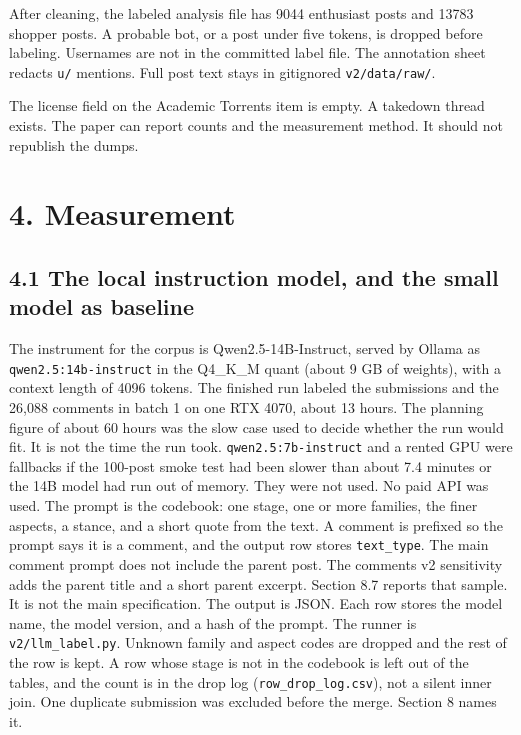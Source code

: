 \documentclass[11pt]{article}
\begin{document}
After cleaning, the labeled analysis file has 9044 enthusiast posts and 13783 shopper posts. A probable bot, or a post under five tokens, is dropped before labeling. Usernames are not in the committed label file. The annotation sheet redacts \texttt{u/} mentions. Full post text stays in gitignored \texttt{v2/data/raw/}.


The license field on the Academic Torrents item is empty. A takedown thread exists. The paper can report counts and the measurement method. It should not republish the dumps.


\section{4. Measurement}

\subsection{4.1 The local instruction model, and the small model as baseline}

The instrument for the corpus is Qwen2.5-14B-Instruct, served by Ollama as \texttt{qwen2.5:14b-instruct} in the Q4\_K\_M quant (about 9 GB of weights), with a context length of 4096 tokens. The finished run labeled the submissions and the 26,088 comments in batch 1 on one RTX 4070, about 13 hours. The planning figure of about 60 hours was the slow case used to decide whether the run would fit. It is not the time the run took. \texttt{qwen2.5:7b-instruct} and a rented GPU were fallbacks if the 100-post smoke test had been slower than about 7.4 minutes or the 14B model had run out of memory. They were not used. No paid API was used. The prompt is the codebook: one stage, one or more families, the finer aspects, a stance, and a short quote from the text. A comment is prefixed so the prompt says it is a comment, and the output row stores \texttt{text\_type}. The main comment prompt does not include the parent post. The comments v2 sensitivity adds the parent title and a short parent excerpt. Section 8.7 reports that sample. It is not the main specification. The output is JSON. Each row stores the model name, the model version, and a hash of the prompt. The runner is \texttt{v2/llm\_label.py}. Unknown family and aspect codes are dropped and the rest of the row is kept. A row whose stage is not in the codebook is left out of the tables, and the count is in the drop log (\texttt{row\_drop\_log.csv}), not a silent inner join. One duplicate submission was excluded before the merge. Section 8 names it.
\end{document}

